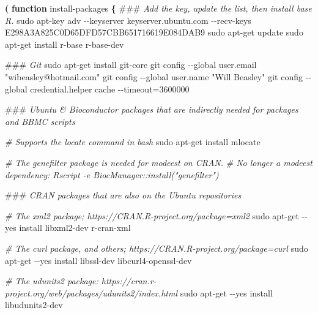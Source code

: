 \documentclass[
]{book}
\newenvironment{Shaded}{\begin{snugshade}}{\end{snugshade}}
\newcommand{\AlertTok}[1]{\textcolor[rgb]{0.94,0.16,0.16}{#1}}
\newcommand{\CommentTok}[1]{\textcolor[rgb]{0.56,0.35,0.01}{\textit{#1}}}
\newcommand{\FunctionTok}[1]{\textcolor[rgb]{0.00,0.00,0.00}{#1}}
\newcommand{\KeywordTok}[1]{\textcolor[rgb]{0.13,0.29,0.53}{\textbf{#1}}}
\newcommand{\NormalTok}[1]{#1}
\newcommand{\StringTok}[1]{\textcolor[rgb]{0.31,0.60,0.02}{#1}}
\begin{document}
\begin{Shaded}
\begin{Highlighting}[]
\KeywordTok{(} \KeywordTok{function}\FunctionTok{ install{-}packages} \KeywordTok{\{}
  \AlertTok{\#\#\#}\CommentTok{ Add the key, update the list, then install base R.}
  \FunctionTok{sudo}\NormalTok{ apt{-}key adv {-}{-}keyserver keyserver.ubuntu.com {-}{-}recv{-}keys E298A3A825C0D65DFD57CBB651716619E084DAB9}
  \FunctionTok{sudo}\NormalTok{ apt{-}get update}
  \FunctionTok{sudo}\NormalTok{ apt{-}get install r{-}base r{-}base{-}dev}
  
  \AlertTok{\#\#\#}\CommentTok{ Git}
  \FunctionTok{sudo}\NormalTok{ apt{-}get install git{-}core}
  \FunctionTok{git}\NormalTok{ config {-}{-}global user.email }\StringTok{"wibeasley@hotmail.com"}
  \FunctionTok{git}\NormalTok{ config {-}{-}global user.name }\StringTok{"Will Beasley"}
  \FunctionTok{git}\NormalTok{ config {-}{-}global credential.helper }\StringTok{\textquotesingle{}cache {-}{-}timeout=3600000\textquotesingle{}}

  \AlertTok{\#\#\#}\CommentTok{ Ubuntu \& Bioconductor packages that are indirectly needed for packages and BBMC scripts}

  \CommentTok{\# Supports the \textasciigrave{}locate\textasciigrave{} command in bash}
  \FunctionTok{sudo}\NormalTok{ apt{-}get install mlocate}

  \CommentTok{\# The genefilter package is needed for \textquotesingle{}modeest\textquotesingle{} on CRAN.}
  \CommentTok{\# No longer a modeest dependency: Rscript {-}e \textquotesingle{}BiocManager::install("genefilter")\textquotesingle{}}
  
  \AlertTok{\#\#\#}\CommentTok{ CRAN packages that are also on the Ubuntu repositories}
  
  \CommentTok{\# The \textquotesingle{}xml2\textquotesingle{} package; https://CRAN.R{-}project.org/package=xml2 }
  \FunctionTok{sudo}\NormalTok{ apt{-}get {-}{-}yes install libxml2{-}dev r{-}cran{-}xml}

  \CommentTok{\# The \textquotesingle{}curl\textquotesingle{} package, and others; https://CRAN.R{-}project.org/package=curl }
  \FunctionTok{sudo}\NormalTok{ apt{-}get {-}{-}yes install libssl{-}dev libcurl4{-}openssl{-}dev}

  \CommentTok{\# The \textquotesingle{}udunits2\textquotesingle{} package: https://cran.r{-}project.org/web/packages/udunits2/index.html}
  \FunctionTok{sudo}\NormalTok{ apt{-}get {-}{-}yes install libudunits2{-}dev}


\end{Highlighting}
\end{Shaded}
\end{document}

